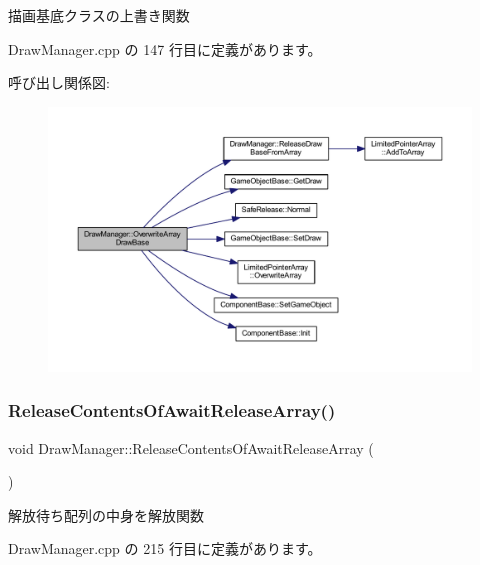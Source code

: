 描画基底クラスの上書き関数 



 Draw\+Manager.\+cpp の 147 行目に定義があります。

呼び出し関係図\+:
\nopagebreak
\begin{figure}[H]
\begin{center}
\leavevmode
\includegraphics[width=350pt]{class_draw_manager_a94ef5a241c8d78187a2a6c0ed3c9efec_cgraph}
\end{center}
\end{figure}
\mbox{\label{class_draw_manager_a76361402a035f02084e9faf31e782d69}} 
\subsubsection{\texorpdfstring{Release\+Contents\+Of\+Await\+Release\+Array()}{ReleaseContentsOfAwaitReleaseArray()}}
{\footnotesize\ttfamily void Draw\+Manager\+::\+Release\+Contents\+Of\+Await\+Release\+Array (\begin{DoxyParamCaption}{ }\end{DoxyParamCaption})\hspace{0.3cm}{\ttfamily [private]}}



解放待ち配列の中身を解放関数 



 Draw\+Manager.\+cpp の 215 行目に定義があります。

